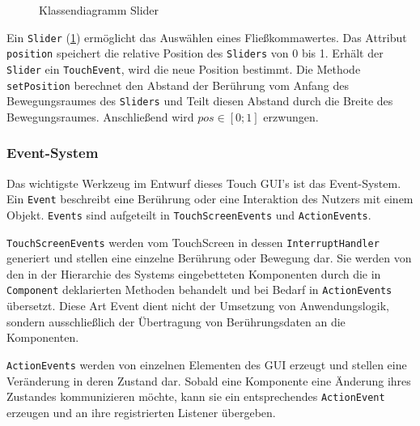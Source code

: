 		\medskip
		\begin{figure}
			\caption{Klassendiagramm Slider}
			\label{uml-slider}
		\end{figure}
		Ein \texttt{Slider} (\ref{uml-slider}) ermöglicht das Auswählen eines Fließkommawertes.
		Das Attribut \texttt{position} speichert die relative Position des \texttt{Sliders} von 0 bis 1.
		Erhält der \texttt{Slider} ein \texttt{TouchEvent}, wird die neue Position bestimmt.
		Die Methode \texttt{setPosition} berechnet den Abstand der Berührung vom Anfang des Bewegungsraumes des \texttt{Sliders}
		und Teilt diesen Abstand durch die Breite des Bewegungsraumes. Anschließend wird $pos \in [0; 1]$ erzwungen.
		
	\subsubsection{Event-System}\label{sec:EventSystem}
		Das wichtigste Werkzeug im Entwurf dieses Touch GUI's ist das Event-System.
		Ein \texttt{Event} beschreibt eine Berührung oder eine Interaktion des Nutzers mit einem Objekt.
		\texttt{Events} sind aufgeteilt in \texttt{TouchScreenEvents} und \texttt{ActionEvents}.

		\texttt{TouchScreenEvents} werden vom TouchScreen in dessen \texttt{InterruptHandler} generiert und stellen eine einzelne Berührung oder Bewegung dar.
		Sie werden von den in der Hierarchie des Systems eingebetteten Komponenten durch die in \texttt{Component} deklarierten Methoden behandelt
		und bei Bedarf in \texttt{ActionEvents} übersetzt.
		Diese Art Event dient nicht der Umsetzung von Anwendungslogik, sondern ausschließlich der Übertragung von Berührungsdaten an die Komponenten.
		
		\texttt{ActionEvents} werden von einzelnen Elementen des GUI erzeugt und stellen eine Veränderung in deren Zustand dar.
		Sobald eine Komponente eine Änderung ihres Zustandes kommunizieren möchte, kann sie ein entsprechendes \texttt{ActionEvent} erzeugen
		und an ihre registrierten Listener übergeben.
		
		